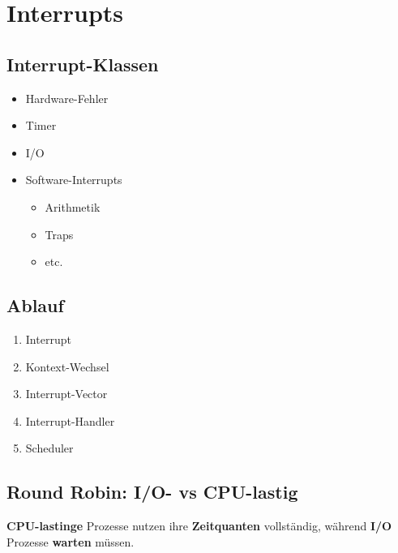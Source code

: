 \section{Interrupts}
\subsection{Interrupt-Klassen}
\begin{itemize}
    \item Hardware-Fehler
    \item Timer
    \item I/O
    \item Software-Interrupts
    \begin{itemize}
        \item Arithmetik
        \item Traps
        \item etc.
    \end{itemize}
\end{itemize}

\subsection{Ablauf}
\begin{enumerate}
    \item Interrupt
    \item Kontext-Wechsel
    \item Interrupt-Vector
    \item Interrupt-Handler
    \item Scheduler
\end{enumerate}

\subsection{Round Robin: I/O- vs CPU-lastig}
\textbf{CPU-lastinge} Prozesse nutzen ihre \textbf{Zeitquanten} vollständig, während \textbf{I/O}
Prozesse \textbf{warten} müssen.

